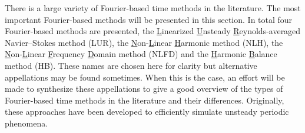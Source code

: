

There is a large variety of Fourier-based time methods in the
literature. 
The most important Fourier-based methods will be presented in this section.
In total four Fourier-based methods are presented, 
the \underline{L}inearized \underline{U}nsteady 
\underline{R}eynolds-averaged
Navier--Stokes method (LUR), 
the \underline{N}on-\underline{L}inear 
\underline{H}armonic method (NLH), the \underline{N}on-\underline{L}inear 
\underline{F}requency \underline{D}omain
method (NLFD) and the \underline{H}armonic \underline{B}alance 
method (HB).
These names are chosen here
for clarity but alternative appellations may be found sometimes. 
When this is the case, an effort will be made to synthesize
these appellations to give a good 
overview of the types of Fourier-based time methods in the literature
and their differences. Originally, these approaches have been developed
to efficiently simulate unsteady periodic phenomena.

